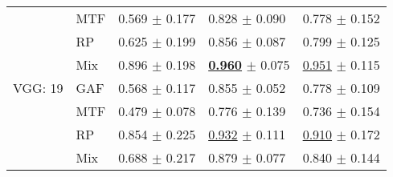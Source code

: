 \begin{tabular}{lllll}
 & MTF & \textcolor[rgb]{0.7868803799,0.2131196201,0}{0.569} $\pm$ \textcolor[rgb]{0.6768896378,0.3231103622,0}{0.177} & \textcolor[rgb]{0.6747967480,0.3252032520,0}{0.828} $\pm$ \textcolor[rgb]{0.2405929417,0.5000000000,0}{0.090} & \textcolor[rgb]{0.7179487179,0.2820512821,0}{0.778} $\pm$ \textcolor[rgb]{0.3470343755,0.5000000000,0}{0.152} \\
 & RP & \textcolor[rgb]{0.6562778272,0.3437221728,0}{0.625} $\pm$ \textcolor[rgb]{0.7623521573,0.2376478427,0}{0.199} & \textcolor[rgb]{0.5325203252,0.4674796748,0}{0.856} $\pm$ \textcolor[rgb]{0.2226403475,0.5000000000,0}{0.087} & \textcolor[rgb]{0.6410256410,0.3589743590,0}{0.799} $\pm$ \textcolor[rgb]{0.1811818997,0.5000000000,0}{0.125} \\
 & Mix & \textcolor[rgb]{0.0195903829,0.5000000000,0}{0.896} $\pm$ \textcolor[rgb]{0.7578007605,0.2421992395,0}{0.198} & \underline{\textbf{\textcolor[rgb]{0.0000000000,0.5000000000,0}{0.960}}} $\pm$ \textcolor[rgb]{0.1431882304,0.5000000000,0}{0.075} & \underline{\textcolor[rgb]{0.0769230769,0.5000000000,0}{0.951}} $\pm$ \textcolor[rgb]{0.1159746586,0.5000000000,0}{0.115} \\
VGG: 19 & GAF & \textcolor[rgb]{0.7898486198,0.2101513802,0}{0.568} $\pm$ \textcolor[rgb]{0.4463877156,0.5000000000,0}{0.117} & \textcolor[rgb]{0.5365853659,0.4634146341,0}{0.855} $\pm$ \textcolor[rgb]{0.0032158844,0.5000000000,0}{0.052} & \textcolor[rgb]{0.7179487179,0.2820512821,0}{0.778} $\pm$ \textcolor[rgb]{0.0765276710,0.5000000000,0}{0.109} \\
 & MTF & \textcolor[rgb]{1.0000000000,0.0000000000,0}{0.479} $\pm$ \textcolor[rgb]{0.2975918104,0.5000000000,0}{0.078} & \textcolor[rgb]{0.9410569106,0.0589430894,0}{0.776} $\pm$ \textcolor[rgb]{0.5514159208,0.4485840792,0}{0.139} & \textcolor[rgb]{0.8717948718,0.1282051282,0}{0.736} $\pm$ \textcolor[rgb]{0.3598231789,0.5000000000,0}{0.154} \\
 & RP & \textcolor[rgb]{0.1175422974,0.5000000000,0}{0.854} $\pm$ \textcolor[rgb]{0.8604148146,0.1395851854,0}{0.225} & \underline{\textcolor[rgb]{0.1422764228,0.5000000000,0}{0.932}} $\pm$ \textcolor[rgb]{0.3739711043,0.5000000000,0}{0.111} & \underline{\textcolor[rgb]{0.2307692308,0.5000000000,0}{0.910}} $\pm$ \textcolor[rgb]{0.4708846452,0.5000000000,0}{0.172} \\
 & Mix & \textcolor[rgb]{0.5093499555,0.4906500445,0}{0.688} $\pm$ \textcolor[rgb]{0.8276249752,0.1723750248,0}{0.217} & \textcolor[rgb]{0.4146341463,0.5000000000,0}{0.879} $\pm$ \textcolor[rgb]{0.1596186962,0.5000000000,0}{0.077} & \textcolor[rgb]{0.4871794872,0.5000000000,0}{0.840} $\pm$ \textcolor[rgb]{0.2974495959,0.5000000000,0}{0.144} \\

\end{tabular}
